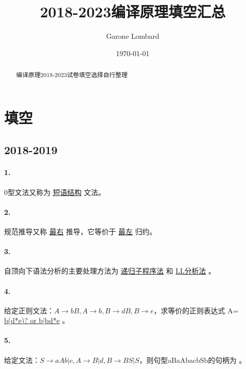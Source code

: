\documentclass[UTF8]{ctexart} %
\title{2018-2023编译原理填空汇总}
\author{Garone Lombard}
\date{\today}
\begin{document}
\maketitle %

\newpage

\begin{abstract}
    编译原理2018-2023试卷填空选择自行整理
\end{abstract}

\newpage

\tableofcontents

\newpage

\section{填空}

\subsection{2018-2019}

\paragraph{1.} 0型文法又称为 \underline{短语结构} 文法。

\paragraph{2.} 规范推导又称 \underline{最右} 推导，它等价于 \underline{最左} 归约。

\paragraph{3.} 自顶向下语法分析的主要处理方法为 \underline{递归子程序法} 和 \underline{LL分析法} 。

\paragraph{4.} 给定正则文法：$A\rightarrow bB,A\rightarrow b,B\rightarrow dB,B\rightarrow e$，求等价的正则表达式 A= \underline{b(d*e)? or b|bd*e} 。

\paragraph{5.} 给定文法：$S\rightarrow aAb|c,A\rightarrow B|d,B\rightarrow BS|S$，则句型aBaAbacbSb的句柄为 \underline{} 。
\end{document}
